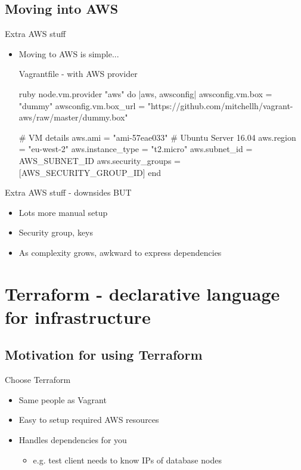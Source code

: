 \documentclass[xcolor=dvipsnames]{beamer}
\begin{document}
\subsection[Cloudy time]{Moving into AWS}
\begin{frame}[fragile]{Extra AWS stuff}
  \begin{itemize}
    \item Moving to AWS is simple...
    \begin{block}{Vagrantfile - with AWS provider}
      \begin{code}{ruby}
node.vm.provider "aws" do |aws, awsconfig|
  awsconfig.vm.box     = "dummy"
  awsconfig.vm.box_url = "https://github.com/mitchellh/vagrant-aws/raw/master/dummy.box"

  # VM details
  aws.ami                = "ami-57eae033" # Ubuntu Server 16.04
  aws.region             = "eu-west-2"
  aws.instance_type      = "t2.micro"
  aws.subnet_id          = AWS_SUBNET_ID
  aws.security_groups    = [AWS_SECURITY_GROUP_ID]
end
      \end{code}
    \end{block}
  \end{itemize}
\end{frame}

\begin{frame}{Extra AWS stuff - downsides}
BUT
  \begin{itemize}
    \item Lots more manual setup
    \item Security group, keys
    \item As complexity grows, awkward to express dependencies
  \end{itemize}
\end{frame}

\section[Terraform]{Terraform - declarative language for infrastructure}

\subsection[Motivation]{Motivation for using Terraform}
\begin{frame}{Choose Terraform}
  \begin{itemize}
    \item Same people as Vagrant
    \item Easy to setup required AWS resources
    \item Handles dependencies for you
    \begin{itemize}
      \item e.g. test client needs to know IPs of database nodes
    \end{itemize}
  \end{itemize}
\end{frame}
\end{document}
